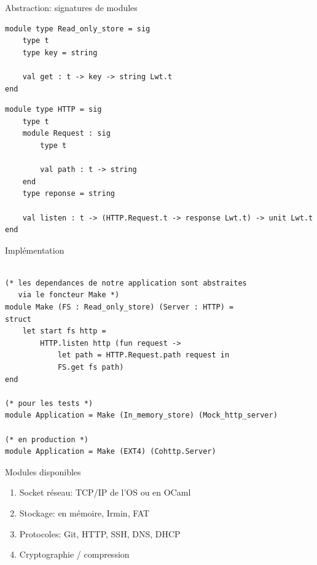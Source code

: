\begin{frame}[fragile]{Abstraction: signatures de modules}

\begin{lstlisting}
module type Read_only_store = sig 
    type t
    type key = string
    
    val get : t -> key -> string Lwt.t
end
\end{lstlisting}

\begin{lstlisting}
module type HTTP = sig
    type t
    module Request : sig 
        type t
        
        val path : t -> string
    end
    type reponse = string
    
    val listen : t -> (HTTP.Request.t -> response Lwt.t) -> unit Lwt.t
end
\end{lstlisting}


\end{frame}

\begin{frame}[fragile]{Implémentation}
    
\begin{lstlisting}

(* les dependances de notre application sont abstraites 
   via le foncteur Make *)
module Make (FS : Read_only_store) (Server : HTTP) = 
struct
    let start fs http =
        HTTP.listen http (fun request ->
            let path = HTTP.Request.path request in
            FS.get fs path)
end

(* pour les tests *)
module Application = Make (In_memory_store) (Mock_http_server)

(* en production *)
module Application = Make (EXT4) (Cohttp.Server)
\end{lstlisting}

\end{frame}

\begin{frame}{Modules disponibles}
\begin{enumerate}[label=$-$]
    \item Socket réseau: TCP/IP de l'OS ou en OCaml
    \item Stockage: en mémoire, Irmin, FAT
    \item Protocoles: Git, HTTP, SSH, DNS, DHCP
    \item Cryptographie / compression
\end{enumerate}
\end{frame}


